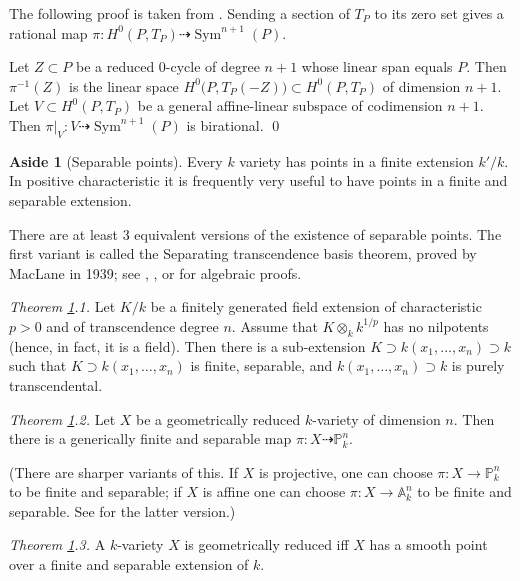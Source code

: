 \documentclass{amsart}
\theoremstyle{definition}
\newtheorem{aside}[thm]{Aside}
\theoremstyle{remark}
\renewcommand{\a}[0]{{\mathbb A}}
\newcommand{\p}[0]{{\mathbb P}}
\newcommand{\map}[0]{\dasharrow}
\newcommand{\sym}[0]{\operatorname{Sym}}
\begin{document}
The following proof is taken from  \cite[8]{k-spsb}. Sending a section of $T_P$ to its zero set 
 gives a rational map  $\pi:H^0(P, T_P)\map \sym^{n+1}(P)$.

Let $Z\subset P$ be a reduced 0-cycle of degree $n+1$ whose linear span equals $P$. 
Then  $\pi^{-1}(Z)$ is the linear space
$H^0\bigl(P, T_P(-Z)\bigr)\subset H^0(P, T_P)$ of dimension $n+1$.
Let $V\subset H^0(P, T_P)$ be a general affine-linear subspace of codimension
$n+1$. Then  $\pi|_V:V\map \sym^{n+1}(P)$ is birational. \qed





\begin{aside}[Separable points] \label{stb.ks.say}
Every $k$ variety has points in a finite extension  $k'/k$.
In positive characteristic it is frequently very useful  to have points in 
a finite  and separable extension.


There are at least 3 equivalent versions of the existence of separable points. The first variant is called 
the Separating transcendence basis theorem, proved by MacLane in 1939;
see  \cite[p.18]{MR0144898}, \cite[8.37]{MR571884}, \cite[Sec.VIII.4]{lang-alg} or \cite[p.558]{eis-ca}
  for algebraic proofs.



\medskip
{\it Theorem \ref{stb.ks.say}.1.} Let $K/k$ be a finitely generated field extension of characteristic $p>0$ and of transcendence degree $n$. 
Assume that  $K\otimes_k k^{1/p} $ has no nilpotents (hence, in fact, it is a field).  Then there is a  sub-extension  $K\supset k(x_1,\dots, x_n)\supset k$
such that $K\supset k(x_1,\dots, x_n)$ is finite, separable, and
$ k(x_1,\dots, x_n)\supset k$ is
purely transcendental.





\medskip
{\it Theorem \ref{stb.ks.say}.2.}  
Let $X$ be  a geometrically reduced $k$-variety of dimension $n$.
Then there is a generically finite and separable map $\pi: X\map \p^n_k$. 

(There are sharper variants of this. 
If $X$ is projective, one can choose $\pi: X\to \p^n_k$ to be finite  and separable;
if $X$ is affine one can choose $\pi: X\to \a^n_k$ to be finite and separable.
See \cite[16.18]{eis-ca} for the latter version.)

\medskip
{\it Theorem \ref{stb.ks.say}.3.} A $k$-variety 
 $X$ is geometrically reduced  iff
 $X$ has a smooth point over a finite and separable extension of $k$.
\end{aside}
\end{document}
